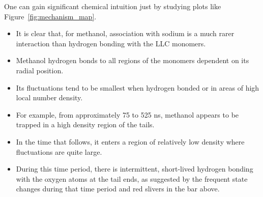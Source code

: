 \documentclass{article}
\begin{document}
  One can gain significant chemical intuition just by studying plots like
  Figure~\ref{fig:mechanism_map}.
  \begin{itemize}
    \item It is clear that, for methanol, association with sodium is a much rarer
    interaction than hydrogen bonding with the LLC monomers.
    \item Methanol hydrogen bonds to all regions of the monomers dependent on
    its radial position.
    \item Its fluctuations tend to be smallest when hydrogen bonded or in areas
    of high local number density. 
    \item For example, from approximately 75 to 525 ns, methanol appears to be trapped
    in a high density region of the tails.
    \item In the time that follows, it enters a region of relatively low density
    where fluctuations are quite large. 
    \item During this time period, there is intermittent, short-lived hydrogen 
    bonding with the oxygen atoms at the tail ends, as suggested by the frequent 
    state changes during that time period and red slivers in the bar above.
  \end{itemize}

  
  
\end{document}
